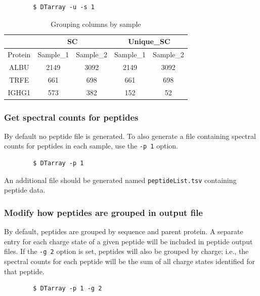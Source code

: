 \documentclass[12pt]{article}
\begin{document}
	\begin{lstlisting}
		$ DTarray -u -s 1
	\end{lstlisting}
	
	\begin{table}[h!]
		\centering
		\footnotesize
		\begin{tabular}{ccccc}
			\toprule
			& \multicolumn{2}{c}{SC}
			& \multicolumn{2}{c}{Unique\_SC} \\
			\midrule
			Protein & Sample\_1 & Sample\_2 & Sample\_1 & Sample\_2 \\ 
			\midrule
			ALBU & 2149 & 3092 & 2149 & 3092 \\
			TRFE & 661 & 698 & 661 & 698 \\ 
			IGHG1 & 573 & 382 & 152 & 52 \\ 
			\toprule
		\end{tabular}
		\caption{Grouping columns by sample}
		\label{table:s_1}
	\end{table}
	
	\subsubsection{Get spectral counts for peptides}
	
	By default no peptide file is generated.  To also generate a file containing spectral counts for peptides in each sample, use the \texttt{-p 1} option.
	
	\begin{lstlisting}
		$ DTarray -p 1
	\end{lstlisting}
	
	\noindent
	An additional file should be generated named \texttt{peptideList.tsv} containing peptide data.
	
	\subsubsection{Modify how peptides are grouped in output file}
	
	By default, peptides are grouped by sequence and parent protein.  A separate entry for each	charge state of a given peptide will be  included  in  peptide	output files.  If the \texttt{-g 2} option is set, peptides will also be grouped by charge; i.e., the spectral counts for each peptide will be the sum of all charge states identified for that peptide.
	
	\begin{lstlisting}
		$ DTarray -p 1 -g 2
	\end{lstlisting}
	
\end{document}
